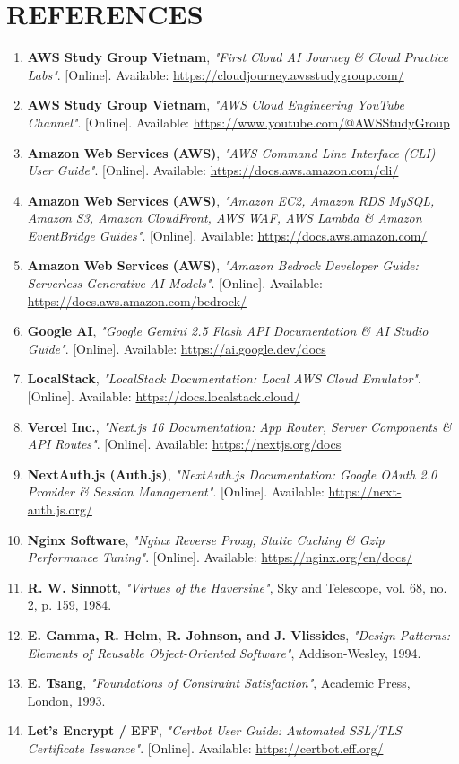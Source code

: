 \newpage
\section*{REFERENCES}

\begin{enumerate}
    \item \textbf{AWS Study Group Vietnam}, \textit{"First Cloud AI Journey \& Cloud Practice Labs"}. [Online]. Available: \url{https://cloudjourney.awsstudygroup.com/}
    \item \textbf{AWS Study Group Vietnam}, \textit{"AWS Cloud Engineering YouTube Channel"}. [Online]. Available: \url{https://www.youtube.com/@AWSStudyGroup}
    \item \textbf{Amazon Web Services (AWS)}, \textit{"AWS Command Line Interface (CLI) User Guide"}. [Online]. Available: \url{https://docs.aws.amazon.com/cli/}
    \item \textbf{Amazon Web Services (AWS)}, \textit{"Amazon EC2, Amazon RDS MySQL, Amazon S3, Amazon CloudFront, AWS WAF, AWS Lambda \& Amazon EventBridge Guides"}. [Online]. Available: \url{https://docs.aws.amazon.com/}
    \item \textbf{Amazon Web Services (AWS)}, \textit{"Amazon Bedrock Developer Guide: Serverless Generative AI Models"}. [Online]. Available: \url{https://docs.aws.amazon.com/bedrock/}
    \item \textbf{Google AI}, \textit{"Google Gemini 2.5 Flash API Documentation \& AI Studio Guide"}. [Online]. Available: \url{https://ai.google.dev/docs}
    \item \textbf{LocalStack}, \textit{"LocalStack Documentation: Local AWS Cloud Emulator"}. [Online]. Available: \url{https://docs.localstack.cloud/}
    \item \textbf{Vercel Inc.}, \textit{"Next.js 16 Documentation: App Router, Server Components \& API Routes"}. [Online]. Available: \url{https://nextjs.org/docs}
    \item \textbf{NextAuth.js (Auth.js)}, \textit{"NextAuth.js Documentation: Google OAuth 2.0 Provider \& Session Management"}. [Online]. Available: \url{https://next-auth.js.org/}
    \item \textbf{Nginx Software}, \textit{"Nginx Reverse Proxy, Static Caching \& Gzip Performance Tuning"}. [Online]. Available: \url{https://nginx.org/en/docs/}
    \item \textbf{R. W. Sinnott}, \textit{"Virtues of the Haversine"}, Sky and Telescope, vol. 68, no. 2, p. 159, 1984.
    \item \textbf{E. Gamma, R. Helm, R. Johnson, and J. Vlissides}, \textit{"Design Patterns: Elements of Reusable Object-Oriented Software"}, Addison-Wesley, 1994.
    \item \textbf{E. Tsang}, \textit{"Foundations of Constraint Satisfaction"}, Academic Press, London, 1993.
    \item \textbf{Let's Encrypt / EFF}, \textit{"Certbot User Guide: Automated SSL/TLS Certificate Issuance"}. [Online]. Available: \url{https://certbot.eff.org/}
\end{enumerate}
\clearpage
